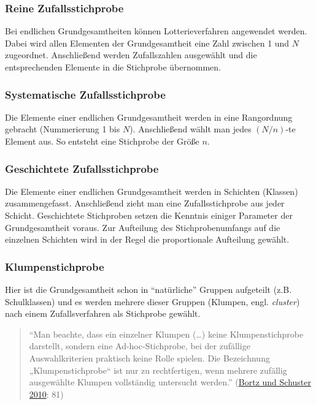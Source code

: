 \documentclass[
  11pt,
  ngerman,
  a4paper,
]{report}
\begin{document}
\hypertarget{reine-zufallsstichprobe}{%
\subsubsection{Reine Zufallsstichprobe}\label{reine-zufallsstichprobe}}

Bei endlichen Grundgesamtheiten können Lotterieverfahren angewendet werden. Dabei wird allen Elementen der Grundgesamtheit eine Zahl zwischen 1 und \(N\) zugeordnet. Anschließend werden Zufallszahlen ausgewählt und die entsprechenden Elemente in die Stichprobe übernommen.

\hypertarget{systematische-zufallsstichprobe}{%
\subsubsection{Systematische Zufallsstichprobe}\label{systematische-zufallsstichprobe}}

Die Elemente einer endlichen Grundgesamtheit werden in eine Rangordnung gebracht (Nummerierung 1 bis \(N\)). Anschließend wählt man jedes \((N/n)\)-te Element aus. So entsteht eine Stichprobe der Größe \(n\).

\hypertarget{geschichtete-zufallsstichprobe}{%
\subsubsection{Geschichtete Zufallsstichprobe}\label{geschichtete-zufallsstichprobe}}

Die Elemente einer endlichen Grundgesamtheit werden in Schichten (Klassen) zusammengefasst. Anschließend zieht man eine Zufallsstichprobe aus jeder Schicht. Geschichtete Stichproben setzen die Kenntnis einiger Parameter der Grundgesamtheit voraus. Zur Aufteilung des Stichprobenumfangs auf die einzelnen Schichten wird in der Regel die proportionale Aufteilung gewählt.

\hypertarget{klumpenstichprobe}{%
\subsubsection{Klumpenstichprobe}\label{klumpenstichprobe}}

Hier ist die Grundgesamtheit schon in \enquote{natürliche} Gruppen aufgeteilt (z.B. Schulklassen) und es werden mehrere dieser Gruppen (Klumpen, engl. \emph{cluster}) nach einem Zufallsverfahren als Stichprobe gewählt.

\begin{quote}
\enquote{Man beachte, dass ein einzelner Klumpen (\ldots) keine Klumpenstichprobe darstellt, sondern eine Ad-hoc-Stichprobe, bei der zufällige Auswahlkriterien praktisch keine Rolle spielen. Die Bezeichnung „Klumpenstichprobe`` ist nur zu rechtfertigen, wenn mehrere zufällig ausgewählte Klumpen vollständig untersucht werden.} (\protect\hyperlink{ref-bortz}{Bortz und Schuster 2010}: 81)
\end{quote}
\end{document}
